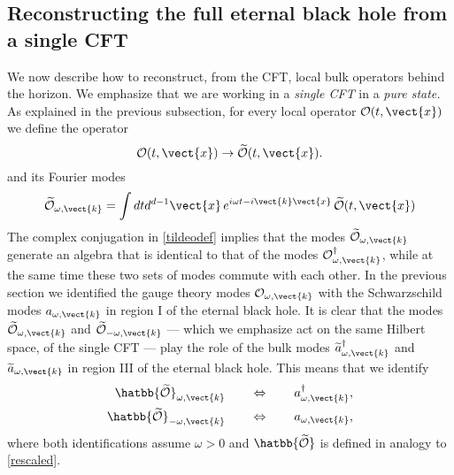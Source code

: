 \subsection{Reconstructing the full eternal black hole from a single CFT}
We now describe how to reconstruct, from the CFT, local bulk operators behind the horizon. We emphasize that we are working in a {\em single CFT} in a {\em pure state.} 
As explained in the previous subsection, for every local operator ${\cal O}(t,\vect{x})$ we define the operator
\[
{\cal O}(t, \vect{x}) \rightarrow \widetilde{\cal O} (t,\vect{x}).
\]
and its Fourier modes
\[
\widetilde{\cal O}_{\omega,\vect{k}} = \int dt d^{d-1}\vect{x} \,e^{i\omega t-i\vect{k} \vect{x}}\, \widetilde{\cal O}(t,\vect{x})
\]
The complex conjugation in \eqref{tildeodef} implies that the  modes $\widetilde{\cal O}_{\omega,\vect{k}}$ generate an algebra that is identical to
that of the modes ${\cal O}^{\dagger}_{\omega,\vect{k}}$, while at the same time these two sets of modes commute with each other. In the previous 
section we identified the gauge theory modes ${\cal O}_{\omega,\vect{k}}$ with the Schwarzschild modes $a_{\omega,\vect{k}}$ in region I of the eternal black hole. It is clear that the modes $\widetilde{\cal O}_{\omega,\vect{k}}$ and $\widetilde{\cal O}_{-\omega,\vect{k}}$ --- which we emphasize act on the same Hilbert space, of the single CFT --- play the role of the bulk modes $\widetilde{a}^{\dagger}_{\omega,\vect{k}}$ and $\widetilde{a}_{\omega,\vect{k}}$  in region III of the eternal black hole. This means that we identify
\[
\begin{split}
\hatbb{\widetilde{\cal O}}_{\omega,\vect{k}}\qquad&\Leftrightarrow \qquad a^{\dagger}_{\omega,\vect{k}},  \\
\hatbb{\widetilde{\cal O}}_{-\omega,\vect{k}}\qquad&\Leftrightarrow \qquad a_{\omega,\vect{k}},  
\end{split}
\]
where both identifications assume $\omega > 0$ and $\hatbb{\widetilde{\cal O}}$ is defined in analogy to \eqref{rescaled}.


